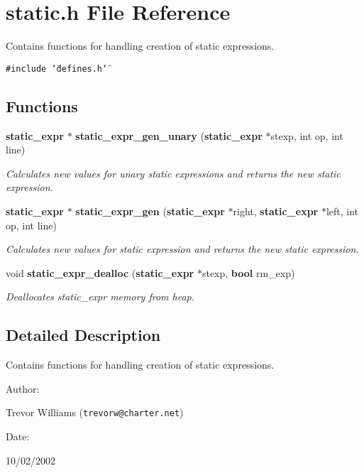 \section{static.h File Reference}
\label{static_8h}
Contains functions for handling creation of static expressions. 


{\tt \#include \char`\"{}defines.h\char`\"{}}\par
\subsection*{Functions}
\begin{CompactItemize}
\item 
{\bf static\_\-expr} $\ast$ {\bf static\_\-expr\_\-gen\_\-unary} ({\bf static\_\-expr} $\ast$stexp, int op, int line)
\begin{CompactList}\small\item\em Calculates new values for unary static expressions and returns the new static expression.\item\end{CompactList}\item 
{\bf static\_\-expr} $\ast$ {\bf static\_\-expr\_\-gen} ({\bf static\_\-expr} $\ast$right, {\bf static\_\-expr} $\ast$left, int op, int line)
\begin{CompactList}\small\item\em Calculates new values for static expression and returns the new static expression.\item\end{CompactList}\item 
void {\bf static\_\-expr\_\-dealloc} ({\bf static\_\-expr} $\ast$stexp, {\bf bool} rm\_\-exp)
\begin{CompactList}\small\item\em Deallocates static\_\-expr memory from heap.\item\end{CompactList}\end{CompactItemize}


\subsection{Detailed Description}
Contains functions for handling creation of static expressions.



\begin{Desc}
\item[Author: ]\par
Trevor Williams ({\tt trevorw@charter.net}) \end{Desc}
\begin{Desc}
\item[Date: ]\par
10/02/2002\end{Desc}


